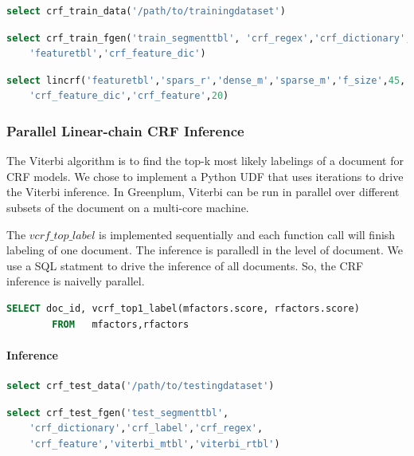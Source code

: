 \documentclass[11pt,letterpaper]{article}
\begin{document}
\begin{lstlisting}[language=SQL,gobble=4]
    select crf_train_data('/path/to/trainingdataset')
\end{lstlisting}

\begin{lstlisting}[language=SQL,gobble=4]
    select crf_train_fgen('train_segmenttbl', 'crf_regex','crf_dictionary', 
    'featuretbl','crf_feature_dic')
\end{lstlisting}

\begin{lstlisting}[language=SQL,gobble=4]
    select lincrf('featuretbl','spars_r','dense_m','sparse_m','f_size',45, 
    'crf_feature_dic','crf_feature',20)
\end{lstlisting}

\subsubsection{Parallel Linear-chain CRF Inference}
 The Viterbi algorithm is to find the top-k most likely labelings of a document 
for CRF models. 
We chose to implement a Python UDF that uses iterations to drive the Viterbi inference. 
In Greenplum, Viterbi can be run in parallel over different subsets 
of the document on a multi-core machine.

The $vcrf\_top\_label$ is implemented sequentially and each function call will finish labeling of one document. 
The inference is paralledl in the level of document. We use a SQL statment to drive the inference of all documents.
So, the CRF inference is naivelly parallel. 
\begin{lstlisting}[language=SQL,gobble=4]
        SELECT doc_id, vcrf_top1_label(mfactors.score, rfactors.score)
        FROM   mfactors,rfactors
\end{lstlisting}

\paragraph{Inference}
\begin{lstlisting}[language=SQL,gobble=4]
    select crf_test_data('/path/to/testingdataset')
\end{lstlisting}

\begin{lstlisting}[language=SQL,gobble=4]
    select crf_test_fgen('test_segmenttbl',
    'crf_dictionary','crf_label','crf_regex',
    'crf_feature','viterbi_mtbl','viterbi_rtbl')
\end{lstlisting}
\end{document}
